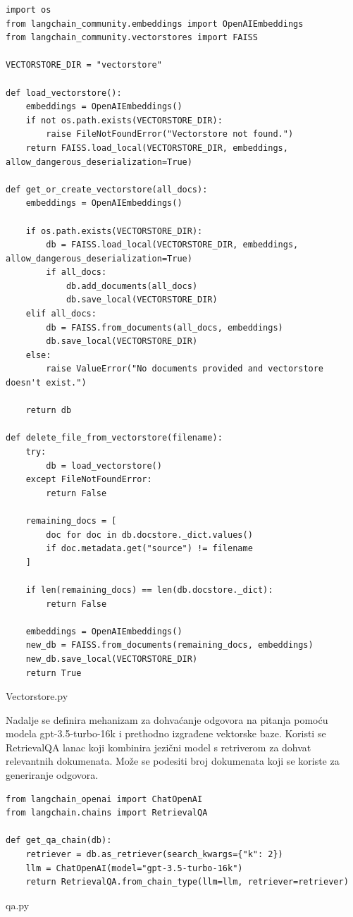 \documentclass[]{foi}
\begin{document}
\begin{longlisting}
\begin{verbatim}
import os
from langchain_community.embeddings import OpenAIEmbeddings
from langchain_community.vectorstores import FAISS

VECTORSTORE_DIR = "vectorstore"

def load_vectorstore():
    embeddings = OpenAIEmbeddings()
    if not os.path.exists(VECTORSTORE_DIR):
        raise FileNotFoundError("Vectorstore not found.")
    return FAISS.load_local(VECTORSTORE_DIR, embeddings, allow_dangerous_deserialization=True)

def get_or_create_vectorstore(all_docs):
    embeddings = OpenAIEmbeddings()

    if os.path.exists(VECTORSTORE_DIR):
        db = FAISS.load_local(VECTORSTORE_DIR, embeddings, allow_dangerous_deserialization=True)
        if all_docs:
            db.add_documents(all_docs)
            db.save_local(VECTORSTORE_DIR)
    elif all_docs:
        db = FAISS.from_documents(all_docs, embeddings)
        db.save_local(VECTORSTORE_DIR)
    else:
        raise ValueError("No documents provided and vectorstore doesn't exist.")

    return db

def delete_file_from_vectorstore(filename):
    try:
        db = load_vectorstore()
    except FileNotFoundError:
        return False

    remaining_docs = [
        doc for doc in db.docstore._dict.values()
        if doc.metadata.get("source") != filename
    ]

    if len(remaining_docs) == len(db.docstore._dict):
        return False

    embeddings = OpenAIEmbeddings()
    new_db = FAISS.from_documents(remaining_docs, embeddings)
    new_db.save_local(VECTORSTORE_DIR)
    return True
\end{verbatim}
\caption{Vectorstore.py}
\label{lst:vectorstore}
\end{longlisting}

Nadalje se definira mehanizam za dohvaćanje odgovora na pitanja pomoću modela gpt-3.5-turbo-16k i prethodno izgrađene vektorske baze.
Koristi se RetrievalQA lanac koji kombinira jezični model s retriverom za dohvat relevantnih dokumenata. Može se podesiti broj dokumenata
koji se koriste za generiranje odgovora.
\begin{longlisting}
\begin{verbatim}
from langchain_openai import ChatOpenAI
from langchain.chains import RetrievalQA

def get_qa_chain(db):
    retriever = db.as_retriever(search_kwargs={"k": 2}) 
    llm = ChatOpenAI(model="gpt-3.5-turbo-16k")
    return RetrievalQA.from_chain_type(llm=llm, retriever=retriever)
\end{verbatim}
\caption{qa.py}
\label{lst:qa}
\end{longlisting}
\end{document}
